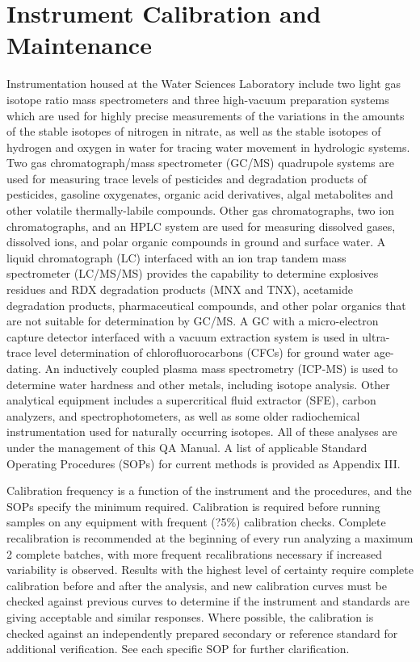 \section{Instrument Calibration and Maintenance}
Instrumentation housed at the Water Sciences Laboratory include two 
light gas isotope ratio mass spectrometers and three high-vacuum 
preparation systems which are used for highly precise measurements of 
the variations in the amounts of the stable isotopes of nitrogen in 
nitrate, as well as the stable isotopes of hydrogen and oxygen in water 
for tracing water movement in hydrologic systems. Two gas 
chromatograph/mass spectrometer (GC/MS) quadrupole systems are used for 
measuring trace levels of pesticides and degradation products of 
pesticides, gasoline oxygenates, organic acid derivatives, algal 
metabolites and other volatile thermally-labile compounds. Other gas 
chromatographs, two ion chromatographs, and an HPLC system are used for 
measuring dissolved gases, dissolved ions, and polar organic compounds 
in ground and surface water. A liquid chromatograph (LC) interfaced with 
an ion trap tandem mass spectrometer (LC/MS/MS) provides the capability 
to determine explosives residues and RDX degradation products (MNX and 
TNX), acetamide degradation products, pharmaceutical compounds, and 
other polar organics that are not suitable for determination by GC/MS. A 
GC with a micro-electron capture detector interfaced with a vacuum 
extraction system is used in ultra-trace level determination of 
chlorofluorocarbons (CFCs) for ground water age-dating. An inductively 
coupled plasma mass spectrometry (ICP-MS) is used to determine water 
hardness and other metals, including isotope analysis. Other analytical 
equipment includes a supercritical fluid extractor (SFE), carbon 
analyzers, and spectrophotometers, as well as some older radiochemical 
instrumentation used for naturally occurring isotopes. All of these 
analyses are under the management of this QA Manual. A list of 
applicable Standard Operating Procedures (SOPs) for current methods is 
provided as Appendix III.

Calibration frequency is a function of the instrument and the 
procedures, and the SOPs specify the minimum required. Calibration is 
required before running samples on any equipment with frequent (?5\%) 
calibration checks. Complete recalibration is recommended at the 
beginning of every run analyzing a maximum 2 complete batches, with more 
frequent recalibrations necessary if increased variability is observed. 
Results with the highest level of certainty require complete calibration 
before and after the analysis, and new calibration curves must be 
checked against previous curves to determine if the instrument and 
standards are giving acceptable and similar responses. Where possible, 
the calibration is checked against an independently prepared secondary 
or reference standard for additional verification. See each specific SOP 
for further clarification.

